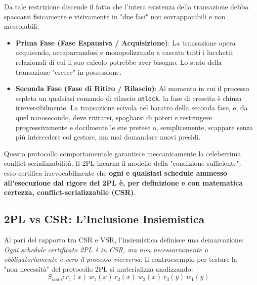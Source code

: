 Da tale restrizione discende il fatto che l'intera esistenza della transazione debba spaccarsi fisicamente e visivamente in "due fasi" non sovrapponibili e non mescolabili:
\begin{itemize}
    \item \textbf{Prima Fase (Fase Espansiva / Acquisizione)}: La transazione opera acquisendo, accaparrandosi e monopolizzando a cascata tutti i lucchetti relazionali di cui il suo calcolo potrebbe aver bisogno. Lo stato della transazione "cresce" in possessione.
    \item \textbf{Seconda Fase (Fase di Ritiro / Rilascio)}: Al momento in cui il processo espleta un qualsiasi comando di rilascio \texttt{unlock}, la fase di crescita è chiusa irreversibilmente. La transazione scivola nel baratro della seconda fase, e, da quel nanosecondo, deve ritirarsi, spogliarsi di poteri e restringere progressivamente e docilmente le sue pretese o, semplicemente, scappare senza più intercedere col gestore, ma mai domandare nuovi presidi.
\end{itemize}

Questo protocollo comportamentale garantisce meccanicamente la celeberrima conflict-serializzabilità. Il 2PL incarna il modello della "condizione sufficiente": esso certifica irrevocabilmente che \textbf{ogni e qualsiasi schedule ammesso all'esecuzione dal rigore del 2PL è, per definizione e con matematica certezza, conflict-serializzabile (CSR)}.

\subsection{2PL vs CSR: L'Inclusione Insiemistica}
Al pari del rapporto tra CSR e VSR, l'insiemistica definisce una demarcazione: \textit{Ogni schedule certificato 2PL è in CSR, ma non necessariamente o obbligatoriamente è vero il processo viceversa}.
Il controesempio per testare la "non necessità" del protocollo 2PL si materializza analizzando:
$$S_{viola}: r_1(x) \ w_1(x) \ r_2(x) \ w_2(x) \ r_3(y) \ w_1(y)$$

